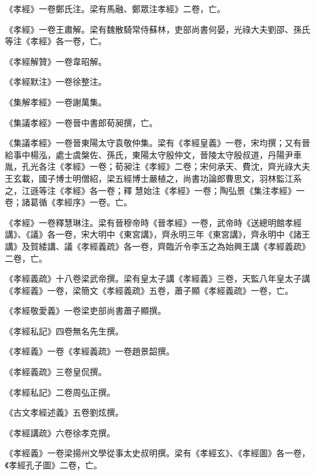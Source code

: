 \begin{pinyinscope}
 《孝經》一卷鄭氏注。梁有馬融、鄭眾注孝經》二卷，亡。



 《孝經》一卷王肅解。梁有魏散騎常侍蘇林，吏部尚書何晏，光祿大夫劉邵、孫氏等注《孝經》各一卷，亡。



 《孝經解贊》一卷韋昭解。



 《孝經默注》一卷徐整注。



 《集解孝經》一卷謝萬集。



 《集議孝經》一卷晉中書郎荀昶撰，亡。



 《集議孝經》一卷晉東陽太守袁敬仲集。梁有《孝經皇義》一卷，宋均撰；又有晉給事中楊泓，處士虞槃佐、孫氏，東陽太守殷仲文，晉陵太守殷叔道，丹陽尹車胤，孔光各注《孝經》一卷；荀昶注《孝經》二卷；宋何承天、費沈，齊光祿大夫王玄載，國子博士明僧紹，梁五經博士嚴植之，尚書功論郎曹思文，羽林監江系之，江遜等注《孝經》各一卷；釋
 慧始注《孝經》一卷；陶弘景《集注孝經》一卷；諸葛循《孝經序》一卷。亡。



 《孝經》一卷釋慧琳注。梁有晉穆帝時《晉孝經》一卷，武帝時《送總明館孝經講》、《議》各一卷，宋大明中《東宮講》，齊永明三年《東宮講》，齊永明中《諸王講》及賀緌講、議《孝經義疏》各一卷，齊臨沂令李玉之為始興王講《孝經義疏》二卷，亡。



 《孝經義疏》十八卷梁武帝撰。梁有皇太子講《孝經義》三卷，天監八年皇太子講《孝經義》一卷，梁簡文《孝經義疏》五卷，蕭子顯《孝經義疏》一卷，亡。



 《孝經敬愛義》一卷梁吏部尚書蕭子顯撰。



 《孝經私記》四卷無名先生撰。



 《孝經義》一卷《孝經義疏》一卷趙景韶撰。



 《孝經義疏》三卷皇侃撰。



 《孝經私記》二卷周弘正撰。



 《古文孝經述義》五卷劉炫撰。



 《孝經講疏》六卷徐孝克撰。



 《孝經義》一卷梁揚州文學從事太史叔明撰。梁有《孝經玄》、《孝經圖》各一卷，《孝經孔子圖》二卷，亡。




\end{pinyinscope}
